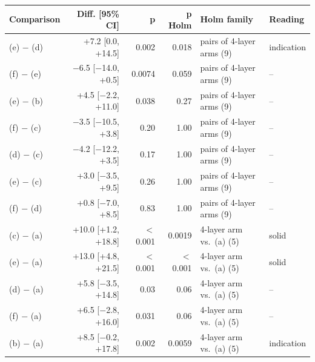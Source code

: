\begin{tabular}{lrrrll}
\toprule
\textbf{Comparison} & \textbf{Diff. [95\% CI]} & \textbf{p} & \textbf{p Holm} & \textbf{Holm family} & \textbf{Reading} \\
\midrule
(e) $-$ (d) & +7.2 [0.0, +14.5] & 0.002 & 0.018 & pairs of 4-layer arms (9) & indication \\
(f) $-$ (e) & $-$6.5 [$-$14.0, +0.5] & 0.0074 & 0.059 & pairs of 4-layer arms (9) & -- \\
(e) $-$ (b) & +4.5 [$-$2.2, +11.0] & 0.038 & 0.27 & pairs of 4-layer arms (9) & -- \\
(f) $-$ (c) & $-$3.5 [$-$10.5, +3.8] & 0.20 & 1.00 & pairs of 4-layer arms (9) & -- \\
(d) $-$ (c) & $-$4.2 [$-$12.2, +3.5] & 0.17 & 1.00 & pairs of 4-layer arms (9) & -- \\
(e) $-$ (c) & +3.0 [$-$3.5, +9.5] & 0.26 & 1.00 & pairs of 4-layer arms (9) & -- \\
(f) $-$ (d) & +0.8 [$-$7.0, +8.5] & 0.83 & 1.00 & pairs of 4-layer arms (9) & -- \\
(c) $-$ (a) & +10.0 [+1.2, +18.8] & $<$0.001 & 0.0019 & 4-layer arm vs.\ (a) (5) & solid \\
(e) $-$ (a) & +13.0 [+4.8, +21.5] & $<$0.001 & $<$0.001 & 4-layer arm vs.\ (a) (5) & solid \\
(d) $-$ (a) & +5.8 [$-$3.5, +14.8] & 0.03 & 0.06 & 4-layer arm vs.\ (a) (5) & -- \\
(f) $-$ (a) & +6.5 [$-$2.8, +16.0] & 0.031 & 0.06 & 4-layer arm vs.\ (a) (5) & -- \\
(b) $-$ (a) & +8.5 [$-$0.2, +17.8] & 0.002 & 0.0059 & 4-layer arm vs.\ (a) (5) & indication \\
\bottomrule
\end{tabular}
